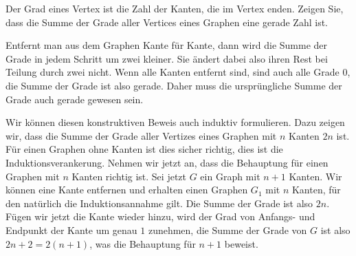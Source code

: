 Der Grad eines Vertex ist die Zahl der Kanten, die im Vertex enden.
Zeigen Sie, dass die Summe der Grade aller Vertices eines Graphen
eine gerade Zahl ist.

\begin{loesung}
Entfernt man aus dem Graphen Kante für Kante, dann wird die
Summe der Grade in jedem Schritt um zwei kleiner. Sie ändert
dabei also ihren Rest bei Teilung durch zwei nicht. Wenn alle
Kanten entfernt sind, sind auch alle Grade 0, die Summe der
Grade ist also gerade. Daher muss die ursprüngliche Summe der
Grade auch gerade gewesen sein.

Wir können diesen konstruktiven Beweis auch induktiv formulieren.
Dazu zeigen wir, dass die Summe der Grade aller Vertizes eines Graphen
mit $n$ Kanten $2n$ ist. Für einen Graphen ohne Kanten ist dies
sicher richtig, dies ist die Induktionsverankerung. Nehmen wir
jetzt an, dass die Behauptung für einen Graphen mit $n$ Kanten
richtig ist. Sei jetzt $G$ ein Graph mit $n+1$ Kanten. Wir können
eine Kante entfernen und erhalten einen Graphen $G_1$ mit $n$
Kanten, für den natürlich die Induktionsannahme gilt. Die Summe
der Grade ist also $2n$. Fügen wir jetzt die Kante wieder hinzu,
wird der Grad von Anfangs- und Endpunkt der Kante um genau $1$
zunehmen, die Summe der Grade von $G$ ist also $2n+2=2(n+1)$,
was die Behauptung für $n+1$ beweist.
\end{loesung}

